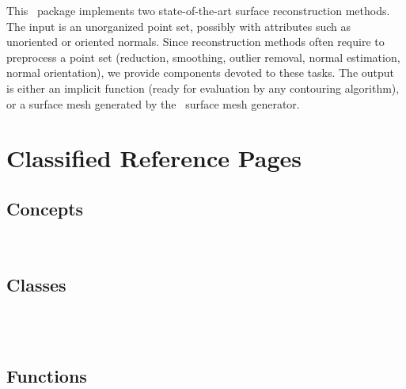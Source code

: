 


This \cgal\ package implements two state-of-the-art surface reconstruction methods.
The input is an unorganized point set, possibly with attributes such as unoriented or oriented normals.
Since reconstruction methods often require to preprocess a point set (reduction, smoothing,
outlier removal, normal estimation, normal orientation), we provide components devoted to these tasks.
The output is either an implicit function (ready for evaluation by any contouring algorithm),
or a surface mesh generated by the \cgal\ surface mesh generator.

\section{Classified Reference Pages}


\subsection{Concepts}

  \\


\subsection{Classes}

  \\
  \\


\subsection{Functions}

  \\
  \\
  \\


